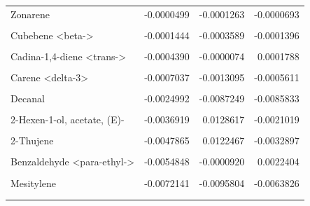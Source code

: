 \documentclass[12pt,final,CPage]{ufthesis}
\begin{document}
{\begin{table}
{\begin{tabular}[t]{lrrr}
  Zonarene & -0.0000499 & -0.0001263 & -0.0000693\\
  \cellcolor{gray!6}{Caryophyllene oxide} & \cellcolor{gray!6}{-0.0000610} & \cellcolor{gray!6}{-0.0002356} & \cellcolor{gray!6}{-0.0000683}\\
  Cubebene <beta-> & -0.0001444 & -0.0003589 & -0.0001396\\
  \addlinespace
  \cellcolor{gray!6}{Acetic acid, hexyl ester} & \cellcolor{gray!6}{-0.0001900} & \cellcolor{gray!6}{-0.0000032} & \cellcolor{gray!6}{0.0000774}\\
  Cadina-1,4-diene <trans-> & -0.0004390 & -0.0000074 & 0.0001788\\
  \cellcolor{gray!6}{Bourbonene <beta->} & \cellcolor{gray!6}{-0.0005735} & \cellcolor{gray!6}{-0.0017143} & \cellcolor{gray!6}{-0.0012675}\\
  Carene <delta-3> & -0.0007037 & -0.0013095 & -0.0005611\\
  \cellcolor{gray!6}{Pentane, 3-ethyl-2,2-dimethyl-} & \cellcolor{gray!6}{-0.0013798} & \cellcolor{gray!6}{0.0001407} & \cellcolor{gray!6}{0.0039958}\\
  \addlinespace
  Decanal & -0.0024992 & -0.0087249 & -0.0085833\\
  \cellcolor{gray!6}{Pinene <1R-alpha->} & \cellcolor{gray!6}{-0.0027658} & \cellcolor{gray!6}{-0.0254298} & \cellcolor{gray!6}{-0.0273103}\\
  2-Hexen-1-ol, acetate, (E)- & -0.0036919 & 0.0128617 & -0.0021019\\
  \cellcolor{gray!6}{Murrolene <alpha->} & \cellcolor{gray!6}{-0.0044423} & \cellcolor{gray!6}{-0.0066743} & \cellcolor{gray!6}{-0.0045472}\\
  2-Thujene & -0.0047865 & 0.0122467 & -0.0032897\\
  \addlinespace
  \cellcolor{gray!6}{Myrcene <beta->} & \cellcolor{gray!6}{-0.0049257} & \cellcolor{gray!6}{0.0158254} & \cellcolor{gray!6}{-0.0045154}\\
  Benzaldehyde <para-ethyl-> & -0.0054848 & -0.0000920 & 0.0022404\\
  \cellcolor{gray!6}{Elemene <beta->} & \cellcolor{gray!6}{-0.0062990} & \cellcolor{gray!6}{-0.0001063} & \cellcolor{gray!6}{0.0025657}\\
  Mesitylene & -0.0072141 & -0.0095804 & -0.0063826\\
  \cellcolor{gray!6}{Copaene <alpha->} & \cellcolor{gray!6}{-0.0073516} & \cellcolor{gray!6}{-0.0011129} & \cellcolor{gray!6}{0.0020442}\\
  \addlinespace

\end{tabular}}
\end{table}}
\end{document}
